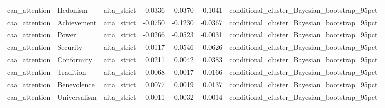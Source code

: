 \begin{tabular}{lllrrrl}
caa\_attention & Hedonism & aita\_strict & 0.0336 & -0.0370 & 0.1041 & conditional\_cluster\_Bayesian\_bootstrap\_95pct \\
caa\_attention & Achievement & aita\_strict & -0.0750 & -0.1230 & -0.0367 & conditional\_cluster\_Bayesian\_bootstrap\_95pct \\
caa\_attention & Power & aita\_strict & -0.0266 & -0.0523 & -0.0031 & conditional\_cluster\_Bayesian\_bootstrap\_95pct \\
caa\_attention & Security & aita\_strict & 0.0117 & -0.0546 & 0.0626 & conditional\_cluster\_Bayesian\_bootstrap\_95pct \\
caa\_attention & Conformity & aita\_strict & 0.0211 & 0.0042 & 0.0383 & conditional\_cluster\_Bayesian\_bootstrap\_95pct \\
caa\_attention & Tradition & aita\_strict & 0.0068 & -0.0017 & 0.0166 & conditional\_cluster\_Bayesian\_bootstrap\_95pct \\
caa\_attention & Benevolence & aita\_strict & 0.0077 & 0.0019 & 0.0137 & conditional\_cluster\_Bayesian\_bootstrap\_95pct \\
caa\_attention & Universalism & aita\_strict & -0.0011 & -0.0032 & 0.0014 & conditional\_cluster\_Bayesian\_bootstrap\_95pct \\
\bottomrule
\end{tabular}
